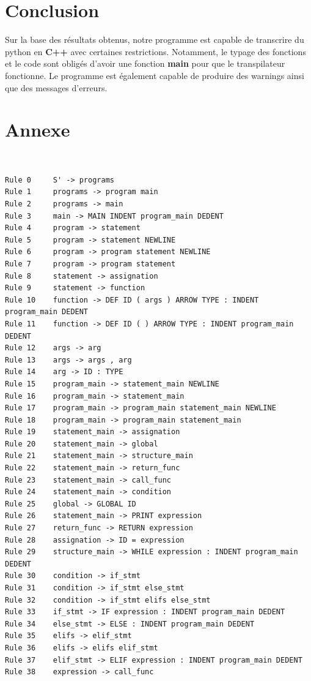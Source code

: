 \chapter{Conclusion}

Sur la base des résultats obtenus, notre programme est capable de transcrire du python en \textbf{C++} avec certaines restrictions.
Notamment, le typage des fonctions et le code sont obligés d'avoir une  fonction \textbf{main} pour que le transpilateur fonctionne.
Le programme est également capable de produire des warnings ainsi que des messages d'erreurs.

\chapter*{Annexe}

~\label{annexe:grammar}
\begin{verbatim}
Rule 0     S' -> programs
Rule 1     programs -> program main
Rule 2     programs -> main
Rule 3     main -> MAIN INDENT program_main DEDENT
Rule 4     program -> statement
Rule 5     program -> statement NEWLINE
Rule 6     program -> program statement NEWLINE
Rule 7     program -> program statement
Rule 8     statement -> assignation
Rule 9     statement -> function
Rule 10    function -> DEF ID ( args ) ARROW TYPE : INDENT program_main DEDENT
Rule 11    function -> DEF ID ( ) ARROW TYPE : INDENT program_main DEDENT
Rule 12    args -> arg
Rule 13    args -> args , arg
Rule 14    arg -> ID : TYPE
Rule 15    program_main -> statement_main NEWLINE
Rule 16    program_main -> statement_main
Rule 17    program_main -> program_main statement_main NEWLINE
Rule 18    program_main -> program_main statement_main
Rule 19    statement_main -> assignation
Rule 20    statement_main -> global
Rule 21    statement_main -> structure_main
Rule 22    statement_main -> return_func
Rule 23    statement_main -> call_func
Rule 24    statement_main -> condition
Rule 25    global -> GLOBAL ID
Rule 26    statement_main -> PRINT expression
Rule 27    return_func -> RETURN expression
Rule 28    assignation -> ID = expression
Rule 29    structure_main -> WHILE expression : INDENT program_main DEDENT
Rule 30    condition -> if_stmt
Rule 31    condition -> if_stmt else_stmt
Rule 32    condition -> if_stmt elifs else_stmt
Rule 33    if_stmt -> IF expression : INDENT program_main DEDENT
Rule 34    else_stmt -> ELSE : INDENT program_main DEDENT
Rule 35    elifs -> elif_stmt
Rule 36    elifs -> elifs elif_stmt
Rule 37    elif_stmt -> ELIF expression : INDENT program_main DEDENT
Rule 38    expression -> call_func

\end{verbatim}
